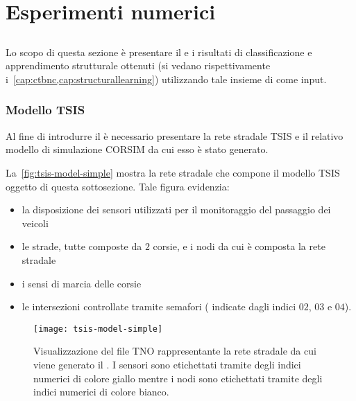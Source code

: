 
\chapter{Esperimenti numerici}\label{cap:esperimenti}
\omissis{}

\section{}\label{sec:dataset-1}
Lo scopo di questa sezione è presentare il  e i risultati di classificazione e apprendimento strutturale ottenuti (si vedano rispettivamente i~\vref{cap:ctbnc,cap:structurallearning}) utilizzando tale insieme di \emph{} come input.

\subsection{Modello TSIS}\label{subsec:tsis-simple-model}
Al fine di introdurre il  è necessario presentare la rete stradale \acs{TSIS} e il relativo modello di simulazione \acs{CORSIM} da cui esso è stato generato.

La~\vref{fig:tsis-model-simple} mostra la rete stradale che compone il modello \acs{TSIS} oggetto di questa sottosezione. Tale figura evidenzia:
\begin{itemize}
	\item la disposizione dei sensori utilizzati per il monitoraggio del passaggio dei veicoli
	\item le strade, tutte composte da $2$ corsie, e i nodi da cui è composta la rete stradale
	\item i sensi di marcia delle corsie
	\item le intersezioni controllate tramite semafori (\ie{} indicate dagli indici $02$, $03$ e $04$).
\end{itemize}
 
\begin{figure}[H]
  	\centering
  	\texttt{[image: tsis-model-simple]}%
  	\caption[Rete stradale del ]{Visualizzazione del file \acs{TNO} rappresentante la rete stradale da cui viene generato il . I sensori sono etichettati tramite degli indici numerici di colore giallo mentre i nodi sono etichettati tramite degli indici numerici di colore bianco.}
	\label{fig:tsis-model-simple}
\end{figure}

